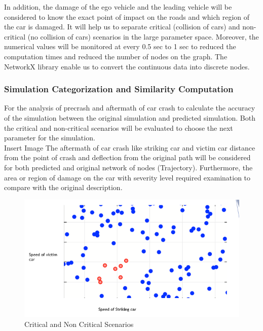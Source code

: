 In addition, the damage of the ego vehicle and the leading vehicle will be considered to know the exact point of impact on the roads and which region of the car is damaged. It will help us to separate critical (collision of cars) and non-critical (no collision of cars) scenarios in the large parameter space. Moreover, the numerical values will be monitored at every 0.5 sec to 1 sec to reduced the computation times and reduced the number of nodes on the graph. The NetworkX \cite{SciPyProceedings_11} library enable us to convert the continuous data into discrete nodes.     

\subsubsection{Simulation Categorization and Similarity Computation}
For the analysis of precrash and aftermath of car crash to calculate the accuracy of the simulation between the original simulation and predicted simulation. Both the critical and non-critical scenarios will be evaluated to choose the next parameter for the simulation.\\
Insert Image
The aftermath of car crash like striking car and victim car distance from the point of crash and deflection from the original path will be considered for both predicted and original network of nodes (Trajectory). Furthermore, the area or region of damage on the car with severity level required examination to compare with the original description. \\  


\begin{figure}[H]
\centering
  \includegraphics[scale = 0.4]{pictures/criticalandnoncriticalscenarios.png}
  \caption{Critical and Non Critical Scenarios}
\end{figure}


